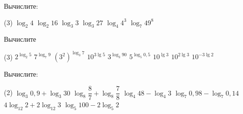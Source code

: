 \begin{class}[number=6]
\begin{listofex}[resume]
\begin{tasks}
		\end{tasks}
		
	\end{listofex}
\end{class}

\begin{homework}[number=3]
	\begin{listofex}
		\item Вычислите:
		\begin{tasks}(3)
			\task \( \log_2 4 \)
			\task \( \log_2 16 \)
			\task \( \log_3 3 \)
			\task \( \log_3 27 \)
			\task \( \log_4 4^3 \)
			\task \( \log_7 49^8 \)
		\end{tasks}
		\item Вычислите
		\begin{tasks}(3)
			\task \( 2^{\log_2 5} \)
			\task \( 7^{\log_7 9} \)
			\task \( (3^2)^{\log_3 7} \)
			\task \( 10^{3\lg 5} \)
			\task \( 3^{\log_3 90} \)
			\task \( 5^{\log_5 0,5} \)
			\task \( 10^{\lg 3} \)
			\task \( 10^{2\lg 3} \)
			\task \( 10^{-3\lg 2} \)
		\end{tasks}
		\item Вычислите:
		\begin{tasks}(2)
			\task \( \log_3 0,9 + \log_3 30 \)
			\task \( \log_8 \dfrac{8}{7} + \log_8 \dfrac{7}{8} \)
			\task \( \log_4 48 - \log_4 3 \)
			\task \( \log_7 0,98 - \log_7 0,14 \)
			\task \( 4\log_{12} 2 + 2\log_{12} 3 \)
			\task \( \log_5 100 - 2 \log_5 2 \)
		\end{tasks}
	\end{listofex}
\end{homework}

